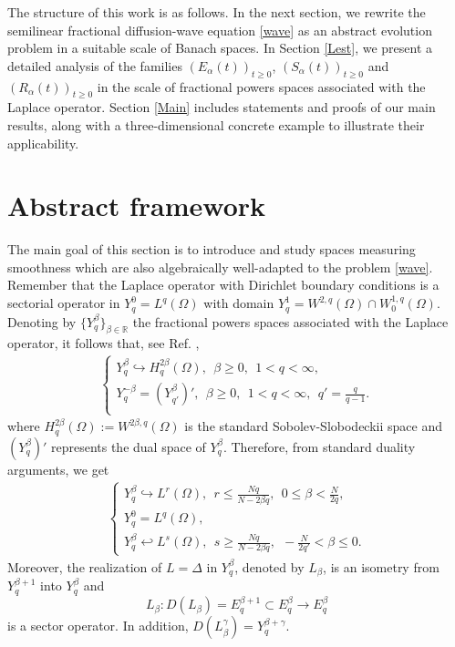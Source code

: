 \documentclass[12pt,reqno]{amsart}
\newcommand{\R}{\mathbb{R}}	%
\begin{document}
The structure of this work is as follows. In the next section, we rewrite the semilinear fractional diffusion-wave equation \eqref{wave} as an abstract evolution problem in a suitable scale of Banach spaces. In Section \ref{Lest}, we present a detailed analysis of the families $(E_{\alpha}(t))_{t\ge0}$, $(S_{\alpha}(t))_{t\ge0}$ and $(R_{\alpha}(t))_{t\ge0}$ in the scale of fractional powers spaces associated with the Laplace operator. Section \ref{Main} includes statements and proofs of our main results, along with a three-dimensional concrete example to illustrate their applicability.
			
			
			
			
\section{Abstract framework}			
The main goal of this section is to introduce and study spaces measuring smoothness which are also algebraically well-adapted to the problem \eqref{wave}. Remember that the Laplace operator with Dirichlet boundary conditions is a sectorial operator in $Y_{q}^{0}=L^q(\Omega)$ with domain  $Y_{q}^{1}=W^{2,q}(\Omega)\cap W_{0}^{1,q}(\Omega)$. Denoting by $\{Y_{q}^{\beta}\}_{\beta\in\R}$ the  fractional powers spaces associated with the Laplace operator, it follows that, see Ref. \cite{Amann2},
\begin{eqnarray*}
	\left\{\begin{array}{lcr}
		Y_{q}^{\beta}\hookrightarrow H_{q}^{2\beta}(\Omega), \ \ \beta\geq 0, \ \ 1<q<\infty,\\
		Y_{q}^{-\beta}=(Y_{q'}^{\beta})', \ \ \beta\geq 0, \ \ 1<q<\infty, \ \ q'=\frac{q}{q-1}.\\
	\end{array}\right.
\end{eqnarray*}
where  $H_{q}^{2\beta}(\Omega):=W^{2\beta,q}(\Omega)$ is the standard Sobolev-Slobodeckii space and $ (Y^{\beta}_{q})'$ represents the dual space of $Y^{\beta}_{q}$. Therefore, from standard duality arguments, we get
\begin{eqnarray}\label{embHeat}
	\left\{\begin{array}{lcr}
		Y_{q}^{\beta}\hookrightarrow L^r(\Omega), \ \ r\leq \frac{Nq}{N-2\beta q}, \ \ 0\leq\beta<\frac{N}{2q},\\
		Y_{q}^{0}=L^q(\Omega),\\
		Y_{q}^{\beta}\hookleftarrow L^s(\Omega), \ \ s\geq \frac{Nq}{N-2\beta q}, \ \ -\frac{N}{2q'}<\beta\leq 0.
	\end{array}\right.
\end{eqnarray}
Moreover, the realization of $L=\Delta$ in $Y_{q}^{\beta}$, denoted by $L_{\beta}$, is an isometry from $Y_{q}^{\beta+1}$ into $Y_{q}^{\beta}$ and 
$$L_{\beta}: D(L_{\beta})=E_{q}^{\beta+1}\subset E_{q}^{\beta}\rightarrow E_{q}^{\beta}$$ 
is a sector operator. In addition, $D(L_{\beta}^{\gamma})=Y_{q}^{\beta+\gamma}$.
\end{document}
